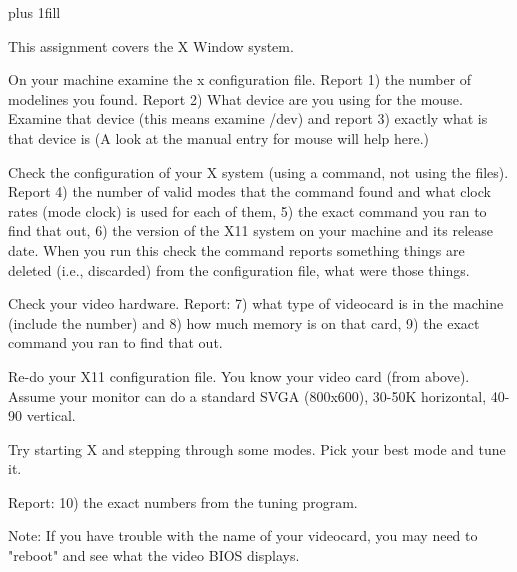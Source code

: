 
\rightskip=0pt plus 1fill

\parindent 0pt

This assignment covers the X Window system.

On your machine examine the x configuration file.
Report 1) the number of modelines you found.
Report 2) What device are you using for the mouse.
Examine that device (this means examine {\ltt{}/dev}) 
and report 3) exactly what is that device is
(A look at the manual entry for mouse will help here.)

Check the configuration of your X system (using a command, not using
the files).
Report 4) the number of valid modes that the command found
and what clock rates (mode clock) is used for each of them,
5) the exact command you ran to find that out,
6) the version of the X11 system on your machine and its release date.
When you run this check the command reports something things are 
deleted (i.e., discarded) from the configuration file,
what were those things.

Check your video hardware.
Report: 7) what type of videocard is in the machine (include the
number) and
8) how much memory is on that card,
9) the exact command you ran to find that out.

Re-do your X11 configuration file.
You know your video card (from above).
Assume your monitor can do a standard SVGA (800x600), 30-50K horizontal,
40-90 vertical.

Try starting X and stepping through some modes. Pick your
best mode and tune it.

Report: 10) the exact numbers from the tuning program.

Note: If you have trouble with the name of your videocard, you may need
to "reboot" and see what the video BIOS displays.
\bye
